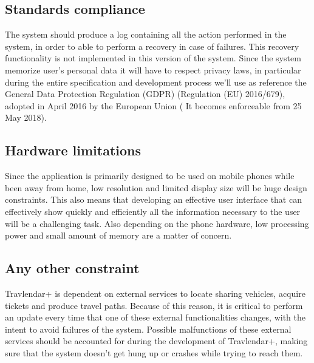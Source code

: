 \subsection{Standards compliance}
\label{subsect:Standards compliance}
	The system should produce a log containing all the action performed in the system, in order to able to perform a recovery in case of failures.
	\newline
	This recovery functionality is not implemented in this version of the system.
	\newline 
	Since the system memorize user's personal data it will have to respect privacy laws, in particular during the entire specification and development process we'll use as reference the General Data Protection Regulation (GDPR) (Regulation (EU) 2016/679), adopted in April 2016 by the European Union ( It becomes enforceable from 25 May 2018).
\subsection{Hardware limitations}
\label{subsect:Hardware limitations}
	Since the application is primarily designed to be used on mobile phones while been away from home, low resolution and limited display size will be huge design constraints.
	\newline
	This also means that developing an effective user interface that can effectively show quickly and efficiently all the information necessary to the user will be a challenging task.
	\newline
	Also depending on the phone hardware, low processing power and small amount of memory are a matter of concern.

\subsection{Any other constraint}
\label{subsect:Any other constraint}
	Travlendar+ is dependent on external services to locate sharing vehicles, acquire tickets and produce travel paths. Because of this reason, it is critical to perform an update every time that one of these external functionalities changes, with the intent to avoid failures of the system.
	\newline
	Possible malfunctions of these external services should be accounted for during the development of Travlendar+, making sure that the system doesn't get hung up or crashes while trying to reach them.
